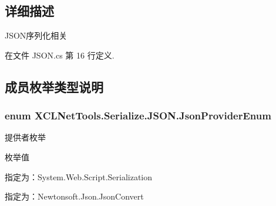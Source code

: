 \subsection{详细描述}
J\-S\-O\-N序列化相关 



在文件 J\-S\-O\-N.\-cs 第 16 行定义.



\subsection{成员枚举类型说明}
\hypertarget{class_x_c_l_net_tools_1_1_serialize_1_1_j_s_o_n_acb00f7258e4dedfaa0cec15ce9335a31}{
\subsubsection[{Json\-Provider\-Enum}]{\setlength{\rightskip}{0pt plus 5cm}enum {\bf X\-C\-L\-Net\-Tools.\-Serialize.\-J\-S\-O\-N.\-Json\-Provider\-Enum}}}\label{class_x_c_l_net_tools_1_1_serialize_1_1_j_s_o_n_acb00f7258e4dedfaa0cec15ce9335a31}


提供者枚举 

\begin{Desc}
\item[枚举值]\par
\begin{description}
\item[{\em 
\hypertarget{class_x_c_l_net_tools_1_1_serialize_1_1_j_s_o_n_acb00f7258e4dedfaa0cec15ce9335a31a67a1b1b70420ea0e3be332a9dedcb83e}{System\-Web}\label{class_x_c_l_net_tools_1_1_serialize_1_1_j_s_o_n_acb00f7258e4dedfaa0cec15ce9335a31a67a1b1b70420ea0e3be332a9dedcb83e}
}]指定为：\-System.\-Web.\-Script.\-Serialization \item[{\em 
\hypertarget{class_x_c_l_net_tools_1_1_serialize_1_1_j_s_o_n_acb00f7258e4dedfaa0cec15ce9335a31a3dae1400047ce0f8033b4d8f2815fc92}{Newtonsoft}\label{class_x_c_l_net_tools_1_1_serialize_1_1_j_s_o_n_acb00f7258e4dedfaa0cec15ce9335a31a3dae1400047ce0f8033b4d8f2815fc92}
}]指定为：\-Newtonsoft.\-Json.\-Json\-Convert \end{description}
\end{Desc}


